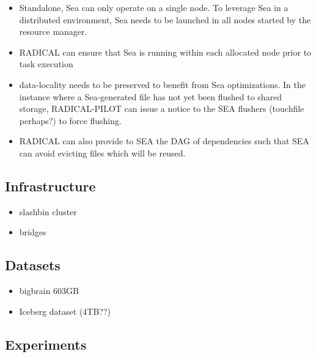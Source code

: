 \documentclass[conference]{IEEEtran}
\begin{document}
    \begin{itemize}
            \item Standalone, Sea can only operate on a single node. To leverage Sea in a distributed environment, Sea needs to be launched in all nodes started by the
        resource manager.
            \item RADICAL can ensure that Sea is running within each allocated node prior to task execution
            \item data-locality needs to be preserved to benefit from Sea optimizations. In the instance where a Sea-generated file has not yet been flushed to shared storage, RADICAL-PILOT can issue a notice to the SEA flushers (touchfile perhaps?) to force flushing.
            \item RADICAL can also provide to SEA the DAG of dependencies such that SEA can avoid evicting files which will be reused.
    \end{itemize}
    \subsection{Infrastructure}
    \begin{itemize}
            \item slashbin cluster
            \item bridges
    \end{itemize}
    \subsection{Datasets}
    \begin{itemize}
            \item bigbrain 603GB
            \item Iceberg dataset (4TB??)
    \end{itemize}
    \subsection{Experiments}
\end{document}
